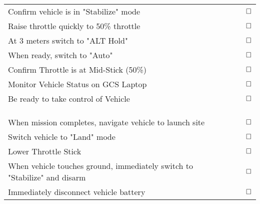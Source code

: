 \documentclass[12pt]{article}
\begin{document}
\begin{longtable}{|>{\raggedright}m{3cm}| m{2cm}| m{2cm}| m{2cm}|m{2cm}|c}
		Confirm vehicle is in "Stabilize" mode                                                     & \multicolumn{4}{c}{ }  & $\huge \square$ \\   \cline{1-1}
		Raise throttle quickly to 50\% throttle                                                     & \multicolumn{4}{c}{ }  & $\huge \square$ \\   \cline{1-1}
		At 3 meters switch to "ALT Hold"                                                           & \multicolumn{4}{c}{ }  & $\huge \square$ \\   \cline{1-1}
		When ready, switch to "Auto"                                                               & \multicolumn{4}{c}{ }  & $\huge \square$ \\   \cline{1-1}
		Confirm Throttle is at Mid-Stick (50\%)                                                     & \multicolumn{4}{c}{ }  & $\huge \square$ \\   \cline{1-1}
		Monitor Vehicle Status on GCS Laptop                                                       & \multicolumn{4}{c}{ }  & $\huge \square$ \\   \cline{1-1}
		Be ready to take control of Vehicle                                                        & \multicolumn{4}{c}{ }  & $\huge \square$ \\   \cline{1-1}
	\multicolumn{6}{c}{ }\\
	\multicolumn{6}{l}{\large\textbf{Land}}                                                                                  \\  \hline
	\multicolumn{6}{c}{ }\\ \cline{1-1}
		When mission completes, navigate vehicle to launch site                                    & \multicolumn{4}{c}{ }  & $\huge \square$ \\   \cline{1-1}
		Switch vehicle to "Land" mode                                                              & \multicolumn{4}{c}{ }  & $\huge \square$ \\   \cline{1-1}
		Lower Throttle Stick                                                                       & \multicolumn{4}{c}{ }  & $\huge \square$ \\   \cline{1-1}
		When vehicle touches ground, immediately switch to "Stabilize" and disarm                  & \multicolumn{4}{c}{ }  & $\huge \square$ \\   \cline{1-1}
		Immediately disconnect vehicle battery                                                     & \multicolumn{4}{c}{ }  & $\huge \square$ \\   \cline{1-1}

\end{longtable}
\end{document}
